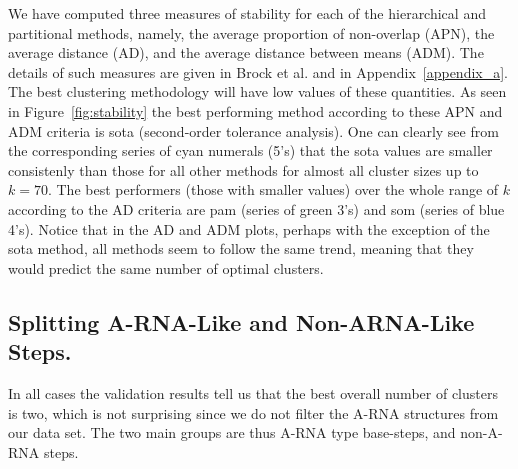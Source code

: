 We  have  computed  three  measures  of  stability  for  each  of  the
hierarchical and  partitional methods, namely,  the average proportion
of  non-overlap (APN),  the  average distance  (AD),  and the  average
distance between means (ADM).  The  details of such measures are given
in      Brock      et      al.       \cite{brock2008}      and      in
Appendix~\ref{appendix_a}. The  best clustering methodology  will have
low values of these quantities.  As seen in Figure~\ref{fig:stability}
the best performing method according  to these APN and ADM criteria is
sota (second-order  tolerance analysis). One can clearly  see from the
corresponding series of  cyan numerals (5's) that the  sota values are
smaller consistenly  than those for  all other methods for  almost all
cluster sizes up  to $k=70$.  The best performers  (those with smaller
values) over the  whole range of $k$ according to  the AD criteria are
pam (series of green 3's) and som (series of blue 4's). Notice that in
the AD  and ADM plots, perhaps  with the exception of  the sota method,
all methods  seem to  follow the same  trend, meaning that  they would
predict the same number of optimal clusters.

\subsection{Splitting A-RNA-Like and Non-ARNA-Like Steps.}  In all
cases the validation  results tell us that the  best overall number of
clusters is  two, which is not  surprising since we do  not filter the
A-RNA structures from our data set.  The two main groups are thus A-RNA
type base-steps, and non-A-RNA steps.

